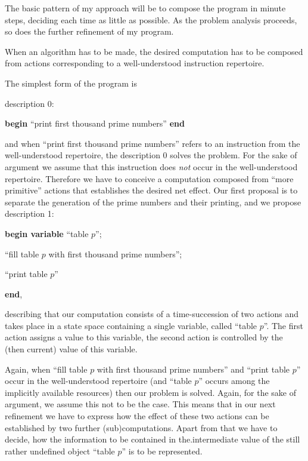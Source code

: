 The basic pattern of my approach will be to compose the program in minute steps, deciding each time as little as possible. As the problem analysis proceeds, so does the further refinement of my program.

When an algorithm has to be made, the desired computation has to be composed from actions corresponding to a well-understood instruction repertoire.

The simplest form of the program is
\medskip

\noindent
description 0:

\textbf{begin} ``print first thousand prime numbers'' \textbf{end}

\noindent
and when ``print first thousand prime numbers'' refers to an instruction from the well-understood repertoire, the description 0 solves the problem. For the sake of argument we assume that this instruction does \textit{not} occur in the well-understood repertoire. Therefore we have to conceive a computation composed from ``more primitive'' actions that establishes the desired net effect. Our first proposal is to separate the generation of the prime numbers and their printing, and we propose description 1:
\medskip

\textbf{begin variable} ``table $p$'';

\quad ``fill table $p$ with first thousand prime numbers'';

\quad ``print table $p$''

\textbf{end},

\noindent
describing that our computation consists of a time-succession of two actions and takes place in a state space containing a single variable, called ``table $p$''. The first action assigns a value to this variable, the second action is controlled by the (then current) value of this variable.

Again, when ``fill table $p$ with first thousand prime numbers'' and ``print table $p$'' occur in the well-understood repertoire (and ``table $p$'' occurs among the implicitly available resources) then our problem is solved. Again, for the sake of argument, we assume this not to be the case. This means that in our next refinement we have to express how the effect of these two actions can be established by two further (sub)computations. Apart from that we have to decide, how the information to be contained in the.intermediate value of the still rather undefined object ``table $p$'' is to be represented.

